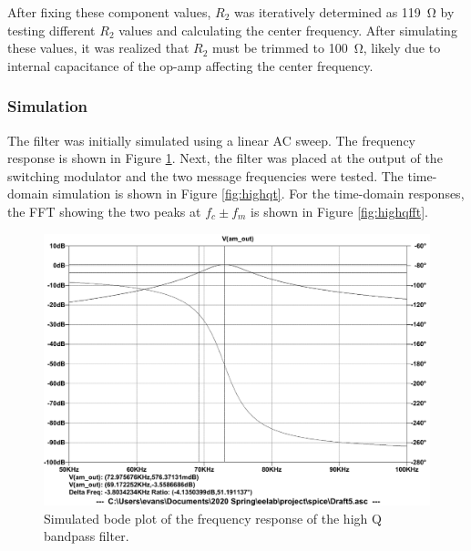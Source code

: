 \documentclass[11pt,letter,notitlepage]{article}
\begin{document}
	After fixing these component values, $R_2$ was iteratively determined as \SI{119}{\ohm} by testing different $R_2$ values and calculating the center frequency. After simulating these values, it was realized that $R_2$ must be trimmed to \SI{100}{\ohm}, likely due to internal capacitance of the op-amp affecting the center frequency.
	
	\subsubsection{Simulation}
	The filter was initially simulated using a linear AC sweep. The frequency response is shown in Figure \ref{fig:highqbpfsweep}. Next, the filter was placed at the output of the switching modulator and the two message frequencies were tested. The time-domain simulation is shown in Figure \ref{fig:highqt}. For the time-domain responses, the FFT showing the two peaks at $f_c \pm f_m$ is shown in Figure \ref{fig:highqfft}.

	\begin{figure}[h]
		\centering
		\includegraphics[width=\linewidth,clip,trim=0 1.1em 0 1.2em]{highqbpf/highqbpfsweep}
		\caption{Simulated bode plot of the frequency response of the high Q bandpass filter.}
		\label{fig:highqbpfsweep}
	\end{figure}
\end{document}

